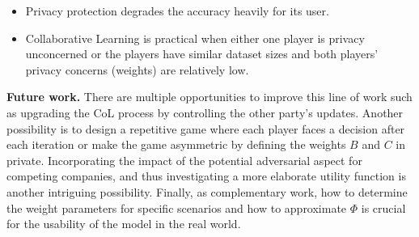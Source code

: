 \documentclass[USenglish,oneside,twocolumn]{article}
\theoremstyle{plain}
\begin{document}
    \begin{itemize}
        \item Privacy protection degrades the accuracy heavily for its user.
        \item Collaborative Learning is practical when either one player is privacy unconcerned or the players have similar dataset sizes and both players' privacy concerns (weights) are relatively low.
    \end{itemize}
    \vspace{-0.25cm}
    
    
    
    \textbf{Future work. }There are multiple opportunities to improve this line of work such as upgrading the CoL process by controlling the other party's updates. Another possibility is to design a repetitive game where each player faces a decision after each iteration or make the game asymmetric by defining the weights $B$ and $C$ in private. %
    Incorporating the impact of the potential adversarial aspect for competing companies, and thus investigating a more elaborate utility function is another intriguing possibility. Finally, as complementary work, how to determine the weight parameters for specific scenarios and how to approximate $\Phi$ is crucial for the usability of the model in the real world.
    
    

    \vspace{-0.5cm}
	{}
	
	
\end{document}
